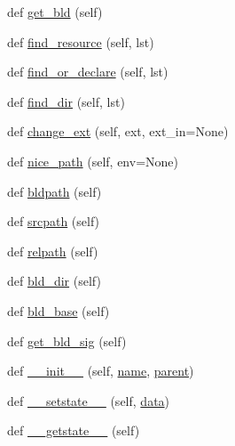 \begin{DoxyCompactItemize}
\item 
def \hyperlink{classwaflib_1_1_node_1_1_node_a181e1ee8473df6b270153d1b071d4dc0}{get\+\_\+bld} (self)
\item 
def \hyperlink{classwaflib_1_1_node_1_1_node_a72b22d40cbdffb458638abb21d706ff8}{find\+\_\+resource} (self, lst)
\item 
def \hyperlink{classwaflib_1_1_node_1_1_node_aca7db00cba3cae363d3b5f689ce10828}{find\+\_\+or\+\_\+declare} (self, lst)
\item 
def \hyperlink{classwaflib_1_1_node_1_1_node_a6b0cb5708818ef6483466202ece39049}{find\+\_\+dir} (self, lst)
\item 
def \hyperlink{classwaflib_1_1_node_1_1_node_ad8e6f438a9b4e34994c8ef82c3b7649d}{change\+\_\+ext} (self, ext, ext\+\_\+in=None)
\item 
def \hyperlink{classwaflib_1_1_node_1_1_node_a84dd8d16929674c2a4dadcc078d9d314}{nice\+\_\+path} (self, env=None)
\item 
def \hyperlink{classwaflib_1_1_node_1_1_node_a1e67abe7b66ef0abd91795547e14a7b7}{bldpath} (self)
\item 
def \hyperlink{classwaflib_1_1_node_1_1_node_a135bd20c340d064fb59d2c8f329fec50}{srcpath} (self)
\item 
def \hyperlink{classwaflib_1_1_node_1_1_node_a4bc57e86dc18da4ce8fc9a669a829186}{relpath} (self)
\item 
def \hyperlink{classwaflib_1_1_node_1_1_node_ae2103a3fade78458d40298173d7179a3}{bld\+\_\+dir} (self)
\item 
def \hyperlink{classwaflib_1_1_node_1_1_node_a56b26245067bfe835f32199e74135a8a}{bld\+\_\+base} (self)
\item 
def \hyperlink{classwaflib_1_1_node_1_1_node_a804270edff72f7bc520841fa60a494e4}{get\+\_\+bld\+\_\+sig} (self)
\item 
def \hyperlink{classwaflib_1_1_node_1_1_node_acf6238a6107f9c667ddd3aee5b30c626}{\+\_\+\+\_\+init\+\_\+\+\_\+} (self, \hyperlink{lib_2expat_8h_a1b49b495b59f9e73205b69ad1a2965b0}{name}, \hyperlink{classwaflib_1_1_node_1_1_node_a2136fddf4c5e98dc8d1661bee03e725c}{parent})
\item 
def \hyperlink{classwaflib_1_1_node_1_1_node_ae1ce2af534851b1b56bc257f486be757}{\+\_\+\+\_\+setstate\+\_\+\+\_\+} (self, \hyperlink{lib_2expat_8h_ac39e72a1de1cb50dbdc54b08d0432a24}{data})
\item 
def \hyperlink{classwaflib_1_1_node_1_1_node_a5f7b73ba50d8a67499518eacf1946689}{\+\_\+\+\_\+getstate\+\_\+\+\_\+} (self)
\item 

\end{DoxyCompactItemize}
